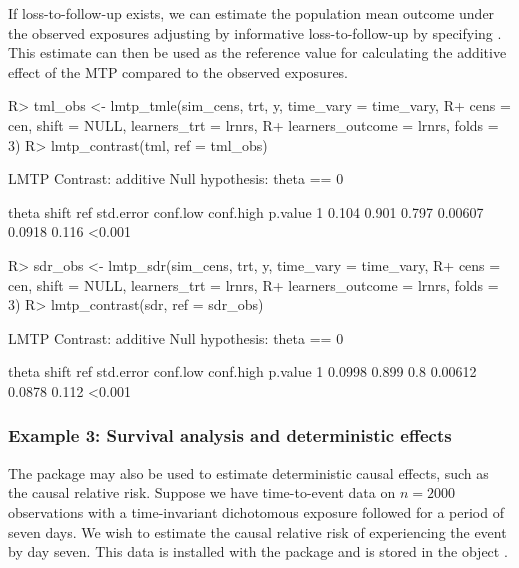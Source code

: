 \documentclass[]{jss}
\begin{document}
If loss-to-follow-up exists, we can estimate the population mean
outcome under the observed exposures adjusting by informative
loss-to-follow-up by specifying . This estimate can
then be used as the reference value for calculating the additive
effect of the MTP compared to the observed exposures.

\begin{CodeChunk}

\begin{CodeInput}
R> tml_obs <- lmtp_tmle(sim_cens, trt, y, time_vary = time_vary, 
R+                      cens = cen, shift = NULL, learners_trt = lrnrs, 
R+                      learners_outcome = lrnrs, folds = 3)
R> lmtp_contrast(tml, ref = tml_obs)
\end{CodeInput}

\begin{CodeOutput}
  LMTP Contrast: additive
Null hypothesis: theta == 0

  theta shift   ref std.error conf.low conf.high p.value
1 0.104 0.901 0.797   0.00607   0.0918     0.116  <0.001
\end{CodeOutput}

\begin{CodeInput}
R> sdr_obs <- lmtp_sdr(sim_cens, trt, y, time_vary = time_vary, 
R+                     cens = cen, shift = NULL, learners_trt = lrnrs, 
R+                     learners_outcome = lrnrs, folds = 3)
R> lmtp_contrast(sdr, ref = sdr_obs)
\end{CodeInput}

\begin{CodeOutput}
  LMTP Contrast: additive
Null hypothesis: theta == 0

   theta shift ref std.error conf.low conf.high p.value
1 0.0998 0.899 0.8   0.00612   0.0878     0.112  <0.001
\end{CodeOutput}

\end{CodeChunk}

\hypertarget{example-3-survival-analysis-and-deterministic-effects}{%
\subsubsection{Example 3: Survival analysis and deterministic effects}\label{example-3-survival-analysis-and-deterministic-effects}}

The  package may also be used to estimate deterministic causal effects, such as the causal relative risk.
Suppose we have time-to-event data on \(n = 2000\) observations with a time-invariant dichotomous exposure followed for a
period of seven days. We wish to estimate the causal relative risk of experiencing the event by day seven. This data is
installed with the package and is stored in the object . 
\end{document}

